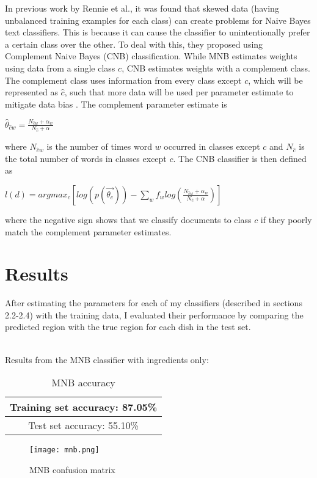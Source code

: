 \documentclass[12pt]{article}
\begin{document}
\noindent In previous work by Rennie et al.\cite{Rennie}, it was found that skewed data (having unbalanced training examples for each class) can create problems for Naive Bayes text classifiers. This is because it can cause the classifier to unintentionally prefer a certain class over the other.
To deal with this, they proposed using Complement Naive Bayes (CNB) classification.
While MNB estimates weights using data from a single class $c$, CNB estimates weights with a complement class. The complement class uses information from every class except $c$, which will be represented as $\hat{c}$, such that more data will be used per parameter estimate to mitigate data bias \cite{Rennie}.
The complement parameter estimate is
\begin{center}
$\hat{\theta}_{\hat{c}w} = \frac{N_{\hat{c}w} + \alpha_w}{N_{\hat{c}} + \alpha}$
\end{center}
where $N_{\hat{c}w}$ is the number of times word $w$ occurred in classes except $c$ and $N_{\hat{c}}$ is
the total number of words in classes except $c$.
The CNB classifier is then defined as
\begin{center}
$l(d) = argmax_c [log(p(\vec{\theta_c})) - \sum_{w} f_w log(\frac{N_{\hat{c}w} + \alpha_w}{N_{\hat{c}} + \alpha})]$
\end{center}
where the negative sign shows that we classify documents to class $c$ if they poorly match the complement parameter estimates.

\section{Results}
After estimating the parameters for each of my classifiers (described in sections 2.2-2.4) with the training data, I evaluated their performance by comparing the predicted region with the true region for each dish in the test set.\\\

\noindent Results from the MNB classifier with ingredients only:\\
\begin{table}[H]
   \centering
\begin{tabular}{ |c| } 
 \hline
 Training set accuracy: 87.05\% \\ 
 \hline
 Test set accuracy: 55.10\% \\ 
 \hline
\end{tabular}
\caption{MNB accuracy}
\label{table:mnb}
\end{table}

\begin{figure}[H]
   \centering
   \texttt{[image: mnb.png]}
   \caption{MNB confusion matrix}
   \label{fig:mnb}
\end{figure}
\end{document}
